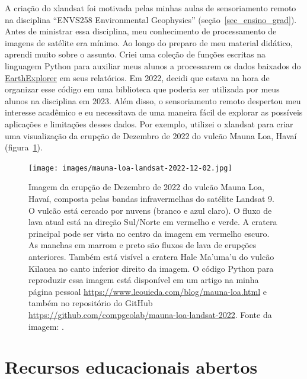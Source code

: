 \documentclass[12pt,a4paper,oneside]{book}
\begin{document}
A criação do xlandsat foi motivada pelas minhas aulas de sensoriamento
remoto na disciplina ``ENVS258 Environmental Geophysics''
(seção~\ref{sec_ensino_grad}).
Antes de ministrar essa disciplina, meu conhecimento de processamento de
imagens de satélite era mínimo.
Ao longo do preparo de meu material didático, aprendi muito sobre o assunto.
Criei uma coleção de funções escritas na linguagem Python para auxiliar meus
alunos a processarem os dados baixados do
\href{https://earthexplorer.usgs.gov/}{EarthExplorer} em seus relatórios.
Em 2022, decidi que estava na hora de organizar esse código em uma biblioteca
que poderia ser utilizada por meus alunos na disciplina em 2023.
Além disso, o sensoriamento remoto despertou meu interesse acadêmico e
eu necessitava de uma maneira fácil de explorar as possíveis aplicações e
limitações desses dados.
Por exemplo, utilizei o xlandsat para criar uma visualização da erupção de
Dezembro de 2022 do vulcão Mauna Loa, Havaí (figura~\ref{fig_maunaloa}).

\begin{figure}[tb]
  \begin{center}
    \texttt{[image: images/mauna-loa-landsat-2022-12-02.jpg]}
  \end{center}
  \caption{
    Imagem da erupção de Dezembro de 2022 do vulcão Mauna Loa, Havaí, composta
    pelas bandas infravermelhas do satélite Landsat 9.
    O vulcão está cercado por nuvens (branco e azul claro). O fluxo de lava
    atual está na direção Sul/Norte em vermelho e verde. A cratera principal
    pode ser vista no centro da imagem em vermelho escuro.
    As manchas em marrom e preto são fluxos de lava de erupções anteriores.
    Também está visível a cratera Hale Ma'uma'u do vulcão Kīlauea no canto
    inferior direito da imagem.
    O código Python para reproduzir essa imagem está disponível em um artigo na
    minha página pessoal \url{https://www.leouieda.com/blog/mauna-loa.html} e
    também no repositório do GitHub
    \url{https://github.com/compgeolab/mauna-loa-landsat-2022}.
    Fonte da imagem: \citet[][CC0]{Uieda2022maunaloa}.
  }
  \label{fig_maunaloa}
\end{figure}


\section{Recursos educacionais abertos}
\label{sec_openedu}
\end{document}
